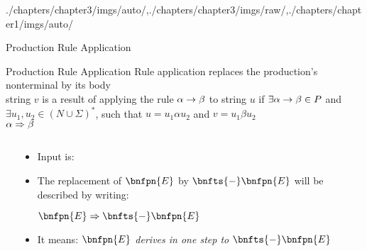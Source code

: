 \begin{graphicspathcontext}{{./chapters/chapter3/imgs/auto/},{./chapters/chapter3/imgs/raw/},{./chapters/chapter1/imgs/auto/}}
\begin{bibunit}[apalike]
\begin{frame}{{Production Rule} Application}
	\begin{definitionblock}{Production Rule Application}
		Rule application replaces the production's nonterminal by its body \\[.2cm]
			 string $v$ is a result of applying the rule $\alpha\rightarrow\beta$ to string $u$ if $\exists \alpha\rightarrow\beta\in P$ and $\exists u_{1},u_{2}\in (N\cup \Sigma )^{*}$, such that $u=u_{1}\alpha u_{2}$ and $v=u_{1}\beta u_{2}$ \\[.2cm]
			 $\alpha \Rightarrow \beta$
	\end{definitionblock}
	\begin{example}
		\begin{columns}
			\begin{column}{.3\linewidth}
				\begin{bnf}
					 \\
					 \\
					 \\
					 \\
				\end{bnf}
			\end{column}
			\begin{column}{.7\linewidth}
				\begin{itemize}
					\item Input is: 
					\item The replacement of $\bnfpn{E}$ by $\bnfts{-} \bnfpn{E}$ will be described by writing:
					\begin{center}
						$\bnfpn{E} \deriv \bnfts{-} \bnfpn{E}$
					\end{center}
					\item It means: \emph{$\bnfpn{E}$ derives in one step to $\bnfts{-} \bnfpn{E}$}
				\end{itemize}
			\end{column}
		\end{columns}
	\end{example}
\end{frame}


\end{bibunit}
\end{graphicspathcontext}
